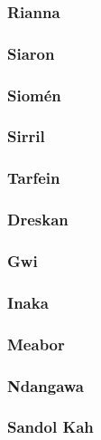 \subsubsection{Rianna}
\label{sec:rianna}

\subsubsection{Siaron}
\label{sec:siaron}

\subsubsection{Siomén}
\label{sec:siomen}

\subsubsection{Sirril}
\label{sec:sirril}

\subsubsection{Tarfein}
\label{sec:tarfein}

\subsubsection{Dreskan}
\label{sec:dreskan}

\subsubsection{Gwi}
\label{sec:gwi}

\subsubsection{Inaka}
\label{sec:inaka}

\subsubsection{Meabor}
\label{sec:meabor}

\subsubsection{Ndangawa}
\label{sec:ndangawa}

\subsubsection{Sandol Kah}
\label{sec:sandol-kah}

